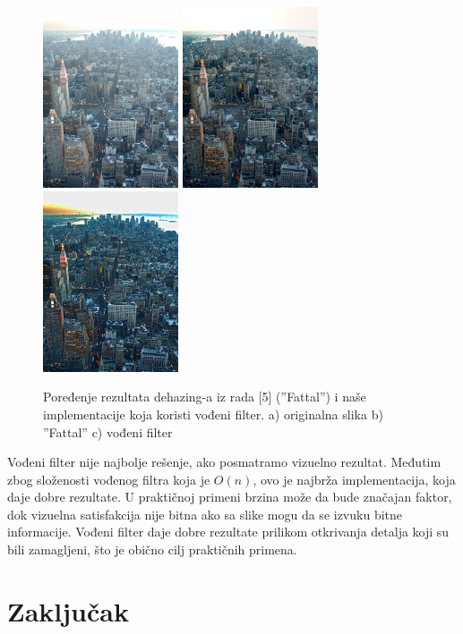 \documentclass[a4paper,12pt,titlepage]{article}
\begin{document}
\begin{figure}[ht!]
\centering
\includegraphics[width=40mm]{img/grad.jpg}
\includegraphics[width=40mm]{img/gradFattal.jpg}
\includegraphics[width=40mm]{img/gradDe.png}
\caption{Poređenje rezultata dehazing-a iz rada [5] (''Fattal'') i naše implementacije koja koristi vođeni filter. a) originalna slika b) ''Fattal'' c) vođeni filter}
\label{grad}
\end{figure} 

Vođeni filter nije najbolje rešenje, ako posmatramo vizuelno rezultat. Međutim zbog složenosti vođenog filtra koja je $O(n)$, ovo je najbrža implementacija, koja daje dobre rezultate. U praktičnoj primeni brzina može da bude značajan faktor, dok vizuelna satisfakcija nije bitna ako sa slike mogu da se izvuku bitne informacije. Vođeni filter daje dobre rezultate prilikom otkrivanja detalja koji su bili zamagljeni, što je obično cilj praktičnih primena.

\section{Zaključak}%
\end{document}
